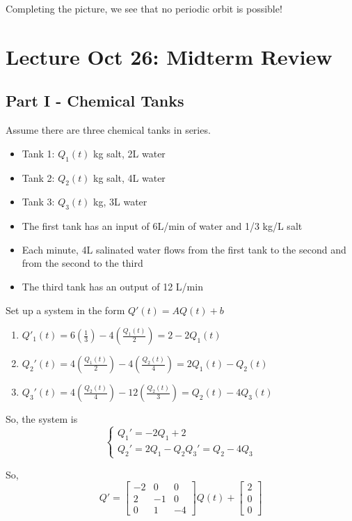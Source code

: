 \documentclass[12pt]{article}
\begin{document}
Completing the picture, we see that no periodic orbit is possible!

\section{Lecture Oct 26: Midterm Review}
\subsection*{Part I - Chemical Tanks}
Assume there are three chemical tanks in series.
\begin{itemize}
    \item Tank 1: $Q_1(t)$ kg salt, 2L water
    \item Tank 2: $Q_2(t)$ kg salt, 4L water
    \item Tank 3: $Q_3(t)$ kg, 3L water
    \item The first tank has an input of 6L/min of water and 1/3 kg/L salt 
    \item Each minute, 4L salinated water flows from the first tank to the second and from the second to the third
    \item The third tank has an output of 12 L/min
\end{itemize}

Set up a system in the form $Q'(t) = AQ(t) + b$

\begin{enumerate}
    \item $Q'_1(t) = 6 (\frac{1}{3}) - 4 \left(\frac{Q_1(t)}{2}\right) = 2 - 2 Q_1(t)$
    \item $Q_2'(t) = 4 \left(\frac{Q_1(t)}{2}\right) - 4\left(\frac{Q_2(t)}{4}\right) = 2Q_1(t) - Q_2(t)$
    \item $Q_3'(t) = 4\left(\frac{Q_2(t)}{4}\right) - 12\left(\frac{Q_2(t)}{3}\right) = Q_2(t) - 4Q_3(t)$
\end{enumerate}

So, the system is 
\[\begin{cases}
    Q_1' = -2Q_1 + 2\\
    Q_2' = 2Q_1 - Q_2
    Q_3' = Q_2 - 4Q_3
\end{cases}\]

So,
\[Q' = \begin{bmatrix}
    -2 & 0 & 0\\
    2 & -1 & 0\\
    0 & 1 & -4
\end{bmatrix} Q(t) + \begin{bmatrix}
    2\\0\\0
\end{bmatrix}\]
\end{document}
